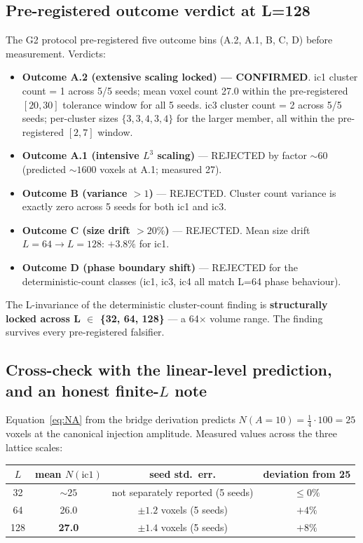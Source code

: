 \documentclass[11pt,reqno]{amsart}
\theoremstyle{plain}
\theoremstyle{definition}
\theoremstyle{remark}
\numberwithin{equation}{section}
\begin{document}
\subsection{Pre-registered outcome verdict at L=128}

The G2 protocol \cite{protocolg2} pre-registered five outcome bins
(A.2, A.1, B, C, D) before measurement. Verdicts:

\begin{itemize}
\item \textbf{Outcome A.2 (extensive scaling locked) --- CONFIRMED}.
ic1 cluster count = 1 across 5/5 seeds; mean voxel count 27.0 within
the pre-registered $[20, 30]$ tolerance window for all 5 seeds. ic3
cluster count = 2 across 5/5 seeds; per-cluster sizes $\{3, 3, 4, 3,
4\}$ for the larger member, all within the pre-registered $[2, 7]$
window.
\item \textbf{Outcome A.1 (intensive $L^{3}$ scaling)} --- REJECTED
by factor $\sim$60 (predicted $\sim 1600$ voxels at A.1; measured 27).
\item \textbf{Outcome B (variance $> 1$)} --- REJECTED. Cluster count
variance is exactly zero across 5 seeds for both ic1 and ic3.
\item \textbf{Outcome C (size drift $> 20\%$)} --- REJECTED. Mean
size drift $L = 64 \to L = 128$: $+3.8\%$ for ic1.
\item \textbf{Outcome D (phase boundary shift)} --- REJECTED for the
deterministic-count classes (ic1, ic3, ic4 all match L=64 phase
behaviour).
\end{itemize}

The L-invariance of the deterministic cluster-count finding is
\textbf{structurally locked across L $\in$ \{32, 64, 128\}} ---
a 64$\times$ volume range. The finding survives every pre-registered
falsifier.

\subsection{Cross-check with the linear-level prediction, and an honest finite-$L$ note}

Equation~\eqref{eq:NA} from the bridge derivation predicts
$N(A = 10) = \tfrac{1}{4} \cdot 100 = 25$ voxels at the canonical
injection amplitude. Measured values across the three lattice scales:

\begin{center}
\begin{tabular}{c c c c}
\toprule
$L$ & mean $N(\text{ic1})$ & seed std.\ err. & deviation from 25 \\
\midrule
32  & $\sim 25$  & not separately reported (5 seeds) & $\leq 0\%$ \\
64  & 26.0       & $\pm 1.2$ voxels (5 seeds)        & $+4\%$ \\
128 & \textbf{27.0} & $\pm 1.4$ voxels (5 seeds)     & $+8\%$ \\
\bottomrule
\end{tabular}
\end{center}
\end{document}
